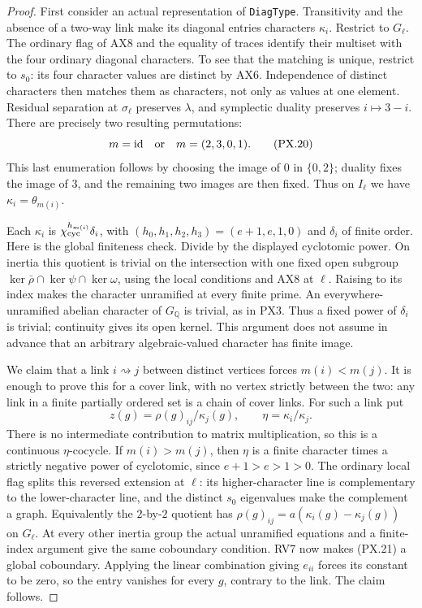 \begin{proof}
First consider an actual representation of
\texttt{DiagType}.  Transitivity and the absence
of a two-way link make its diagonal entries
characters $\kappa_i$.  Restrict to $G_\ell$.
The ordinary flag of AX8 and the equality of
traces identify their multiset with the four
ordinary diagonal characters.  To see that
the matching is unique, restrict to $s_0$:
its four character values are distinct by
AX6.  Independence of distinct characters
then matches them as characters, not only
as values at one element.  Residual separation
at $\sigma_\ell$ preserves $\lambda$, and
symplectic duality preserves $i\mapsto3-i$.
There are precisely two resulting permutations:
\[
                 m=\mathrm{id}\quad\hbox{or}\quad
                 m=(2,3,0,1).
 \tag{PX.20}
\]
This last enumeration follows by choosing the
image of $0$ in $\{0,2\}$; duality fixes
the image of $3$, and the remaining two
images are then fixed.  Thus on $I_\ell$
we have $\kappa_i=\theta_{m(i)}$.

Each $\kappa_i$ is
$\chi_{\rm cyc}^{h_{m(i)}}\delta_i$, with
$(h_0,h_1,h_2,h_3)=(e+1,e,1,0)$ and
$\delta_i$ of finite order.  Here is the
global finiteness check.  Divide by the
displayed cyclotomic power.  On inertia
this quotient is trivial on the intersection
with one fixed open subgroup
$\ker\bar\rho\cap\ker\psi\cap\ker\omega$,
using the local conditions and AX8 at
$\ell$.  Raising to its index makes the
character unramified at every finite prime.
An everywhere-unramified abelian character
of $G_{\mathbb Q}$ is trivial, as in PX3.
Thus a fixed power of $\delta_i$ is trivial;
continuity gives its open kernel.  This
argument does not assume in advance that
an arbitrary algebraic-valued character
has finite image.

We claim that a link $i\rightsquigarrow j$
between distinct vertices forces $m(i)<m(j)$.
It is enough to prove this for a cover link,
with no vertex strictly between the two:
any link in a finite partially ordered
set is a chain of cover links.  For such
a link put
\[
 z(g)=\rho(g)_{ij}/\kappa_j(g),
 \qquad \eta=\kappa_i/\kappa_j.
 \tag{PX.21}
\]
There is no intermediate contribution to
matrix multiplication, so this is a
continuous $\eta$-cocycle.  If $m(i)>m(j)$,
then $\eta$ is a finite character times
a strictly negative power of cyclotomic,
since $e+1>e>1>0$.  The ordinary local
flag splits this reversed extension at
$\ell$: its higher-character line is
complementary to the lower-character
line, and the distinct $s_0$ eigenvalues
make the complement a graph.  Equivalently
the $2$-by-$2$ quotient has
$\rho(g)_{ij}=a(\kappa_i(g)-\kappa_j(g))$
on $G_\ell$.  At every other inertia
group the actual unramified equations
and a finite-index argument give the
same coboundary condition.  RV7 now
makes (PX.21) a global coboundary.
Applying the linear combination giving
$e_{ii}$ forces its constant to be zero,
so the entry vanishes for every $g$,
contrary to the link.  The claim follows.


\end{proof}

